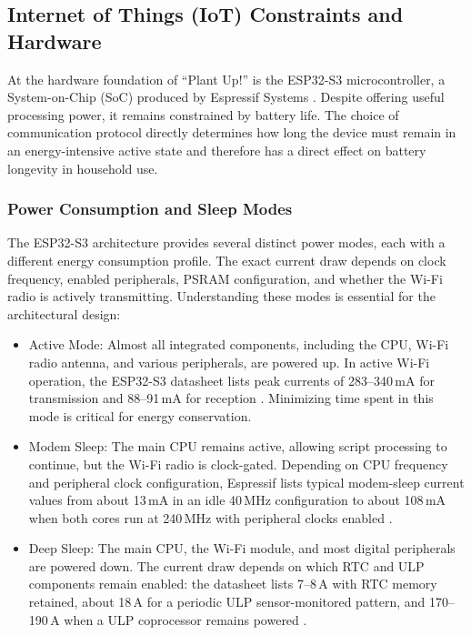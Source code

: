 \subsection{Internet of Things (IoT) Constraints and Hardware}
At the hardware foundation of ``Plant Up!'' is the ESP32-S3 microcontroller, a System-on-Chip (SoC) produced by Espressif Systems \cite{esp32s3Datasheet2026}. Despite offering useful processing power, it remains constrained by battery life. The choice of communication protocol directly determines how long the device must remain in an energy-intensive active state and therefore has a direct effect on battery longevity in household use.

\subsubsection{Power Consumption and Sleep Modes}
The ESP32-S3 architecture provides several distinct power modes, each with a different energy consumption profile. The exact current draw depends on clock frequency, enabled peripherals, PSRAM configuration, and whether the Wi-Fi radio is actively transmitting. Understanding these modes is essential for the architectural design:
\begin{itemize}
    \item Active Mode: Almost all integrated components, including the CPU, Wi-Fi radio antenna, and various peripherals, are powered up. In active Wi-Fi operation, the ESP32-S3 datasheet lists peak currents of 283--340\,mA for transmission and 88--91\,mA for reception \cite{esp32s3Datasheet2026}. Minimizing time spent in this mode is critical for energy conservation.
    \item Modem Sleep: The main CPU remains active, allowing script processing to continue, but the Wi-Fi radio is clock-gated. Depending on CPU frequency and peripheral clock configuration, Espressif lists typical modem-sleep current values from about 13\,mA in an idle 40\,MHz configuration to about 108\,mA when both cores run at 240\,MHz with peripheral clocks enabled \cite{esp32s3Datasheet2026}.
    \item Deep Sleep: The main CPU, the Wi-Fi module, and most digital peripherals are powered down. The current draw depends on which RTC and ULP components remain enabled: the datasheet lists 7--8\,\textmu A with RTC memory retained, about 18\,\textmu A for a periodic ULP sensor-monitored pattern, and 170--190\,\textmu A when a ULP coprocessor remains powered \cite{esp32s3Datasheet2026}.
\end{itemize}

